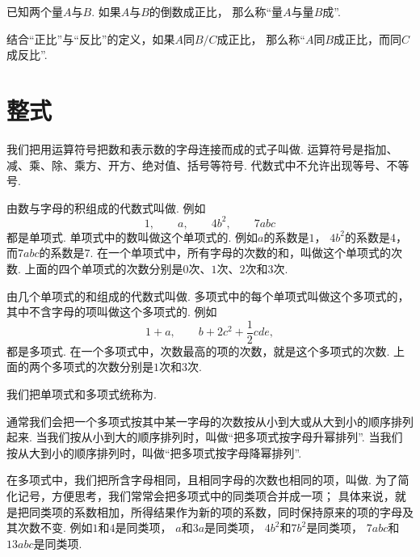 \begin{definition}
已知两个量\(A\)与\(B\).
如果\(A\)与\(B\)的倒数成正比，
那么称“量\(A\)与量\(B\)成”.
\end{definition}

结合“正比”与“反比”的定义，如果\(A\)同\(B/C\)成正比，
那么称“\(A\)同\(B\)成正比，而同\(C\)成反比”.

\section{整式}
我们把用运算符号把数和表示数的字母连接而成的式子叫做.
运算符号是指加、减、乘、除、乘方、开方、绝对值、括号等符号.
代数式中不允许出现等号、不等号.

由数与字母的积组成的代数式叫做.
例如\[
	1, \qquad
	a, \qquad
	4b^2, \qquad
	7abc
\]都是单项式.
单项式中的数叫做这个单项式的.
例如\(a\)的系数是\(1\)，
\(4b^2\)的系数是\(4\)，
而\(7abc\)的系数是\(7\).
在一个单项式中，所有字母的次数的和，叫做这个单项式的次数.
上面的四个单项式的次数分别是\(0\)次、\(1\)次、\(2\)次和\(3\)次.

由几个单项式的和组成的代数式叫做.
多项式中的每个单项式叫做这个多项式的，
其中不含字母的项叫做这个多项式的.
例如\[
	1+a, \qquad
	b+2c^2+\frac12cde,
\]都是多项式.
在一个多项式中，次数最高的项的次数，就是这个多项式的次数.
上面的两个多项式的次数分别是\(1\)次和\(3\)次.

我们把单项式和多项式统称为.

通常我们会把一个多项式按其中某一字母的次数按从小到大或从大到小的顺序排列起来.
当我们按从小到大的顺序排列时，叫做“把多项式按字母升幂排列”.
当我们按从大到小的顺序排列时，叫做“把多项式按字母降幂排列”.

在多项式中，我们把所含字母相同，且相同字母的次数也相同的项，叫做.
为了简化记号，方便思考，我们常常会把多项式中的同类项合并成一项；
具体来说，就是把同类项的系数相加，所得结果作为新的项的系数，同时保持原来的项的字母及其次数不变.
例如\(1\)和\(4\)是同类项，
\(a\)和\(3a\)是同类项，
\(4b^2\)和\(7b^2\)是同类项，
\(7abc\)和\(13abc\)是同类项.
